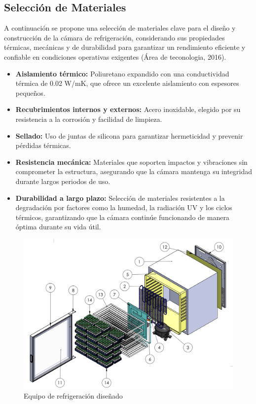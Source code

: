 \documentclass[11pt,a4paper]{article}
\begin{document}
\begin{multicols}{2}
\subsection{Selección de Materiales}
A continuación se propone una selección de materiales clave para el diseño y construcción de la cámara de refrigeración, considerando sus propiedades térmicas, mecánicas y de durabilidad para garantizar un rendimiento eficiente y confiable en condiciones operativas exigentes (Área de teconologia, 2016). 

\begin{itemize}[itemsep=0.25em, topsep=0.25em, partopsep=0pt]
	\item \textbf{Aislamiento térmico:} Poliuretano expandido con una conductividad térmica de 0.02 W/mK, que ofrece un excelente aislamiento con espesores pequeños.
	\item \textbf{Recubrimientos internos y externos:} Acero inoxidable, elegido por su resistencia a la corrosión y facilidad de limpieza.
	\item \textbf{Sellado:} Uso de juntas de silicona para garantizar hermeticidad y prevenir pérdidas térmicas.
	\item \textbf{Resistencia mecánica:} Materiales que soporten impactos y vibraciones sin comprometer la estructura, asegurando que la cámara mantenga su integridad durante largos periodos de uso.
	\item \textbf{Durabilidad a largo plazo:} Selección de materiales resistentes a la degradación por factores como la humedad, la radiación UV y los ciclos térmicos, garantizando que la cámara continúe funcionando de manera óptima durante su vida útil.
\end{itemize}
	
 \begin{figure}[H]
 	\includegraphics[width=\linewidth]{figures/front-chapetr4.png}
 	\caption{Equipo de refrigeración diseñado}
 \end{figure}
 

\end{multicols}
\end{document}
